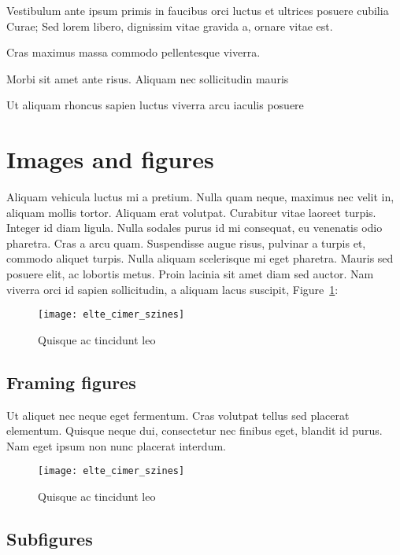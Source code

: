 \bigskip

Vestibulum ante ipsum primis in faucibus orci luctus et ultrices posuere cubilia Curae; Sed lorem libero, dignissim vitae gravida a, ornare vitae est.
\begin{compactdesc}
	\item[Cras maximus] massa commodo pellentesque viverra.
	\item[Morbi sit] amet ante risus. Aliquam nec sollicitudin mauris
	\item[Ut aliquam rhoncus sapien] luctus viverra arcu iaculis posuere
\end{compactdesc}


\section{Images and figures}

Aliquam vehicula luctus mi a pretium. Nulla quam neque, maximus nec velit in, aliquam mollis tortor. Aliquam erat volutpat. Curabitur vitae laoreet turpis. Integer id diam ligula. Nulla sodales purus id mi consequat, eu venenatis odio pharetra. Cras a arcu quam. Suspendisse augue risus, pulvinar a turpis et, commodo aliquet turpis. Nulla aliquam scelerisque mi eget pharetra. Mauris sed posuere elit, ac lobortis metus. Proin lacinia sit amet diam sed auctor. Nam viverra orci id sapien sollicitudin, a aliquam lacus suscipit, Figure~\ref{fig:example-1}:

\begin{figure}[H]
	\centering
	\texttt{[image: elte\_cimer\_szines]}
	\caption{Quisque ac tincidunt leo}
	\label{fig:example-1}
\end{figure}

\subsection{Framing figures}

Ut aliquet nec neque eget fermentum. Cras volutpat tellus sed placerat elementum. Quisque neque dui, consectetur nec finibus eget, blandit id purus. Nam eget ipsum non nunc placerat interdum.

\begin{figure}[H]
	\centering
	\texttt{[image: elte\_cimer\_szines]}
	\caption{Quisque ac tincidunt leo}
\end{figure}

\subsection{Subfigures}

